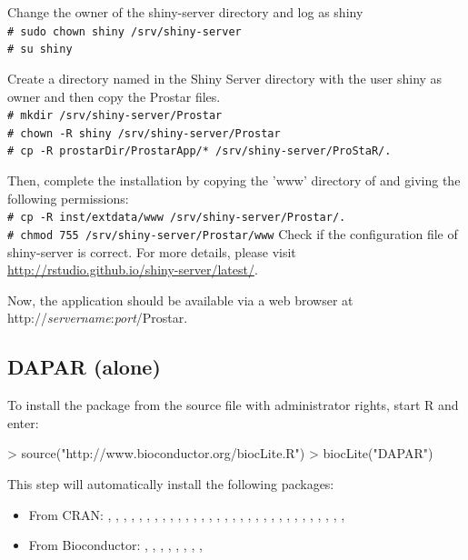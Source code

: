 \documentclass[12pt]{article}
\newcommand{\shellcmd}[1]{\\\indent\indent\texttt{\footnotesize\# #1}}
\begin{document}
Change the owner of the shiny-server directory and log as shiny
\shellcmd{sudo chown shiny /srv/shiny-server}
\shellcmd{su shiny}\newline


Create a directory named  in the Shiny Server directory with 
the user shiny as owner and then copy the Prostar files.\newline
\shellcmd{mkdir /srv/shiny-server/Prostar}
\shellcmd{chown -R shiny /srv/shiny-server/Prostar}
\shellcmd{cp -R prostarDir/ProstarApp/* /srv/shiny-server/ProStaR/.}

Then, complete the installation by copying the 'www' directory of 
 and giving the following permissions:\newline
\shellcmd{cp -R inst/extdata/www /srv/shiny-server/Prostar/.}
\shellcmd{chmod 755 /srv/shiny-server/Prostar/www}\newline
\newline
Check if the configuration file of shiny-server is correct.\newline
For more details, please visit 
\url{http://rstudio.github.io/shiny-server/latest/}.

Now, the application should be available via a web browser at 
http://\emph{servername}:\emph{port}/Prostar.



\subsection{DAPAR (alone)}\label{sec:daparalone}


To install the package  from the source file with administrator 
rights, start R and enter:

\begin{Schunk}
\begin{Sinput}
> source("http://www.bioconductor.org/biocLite.R")
> biocLite("DAPAR")
\end{Sinput}
\end{Schunk}

This step will automatically install the following packages:
\begin{itemize}
\item {From CRAN}: , , , 
, , , , 
, , , ,
, , , , ,
, , , , 
, , , , 
, , , , , , ,
\item {From Bioconductor}: , , , , , , , , 
\end{itemize}
\end{document}
